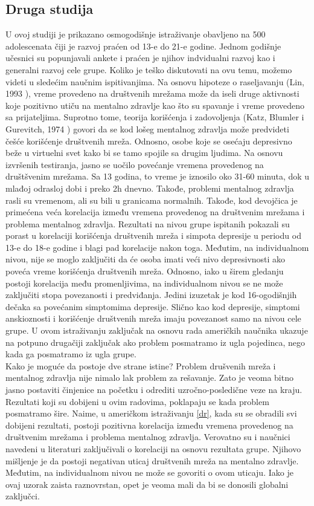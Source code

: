 \documentclass[a4paper]{article}
\begin{document}
{		\subsection{Druga studija}
		\label{dr}
		U ovoj studiji je prikazano osmogodišnje istraživanje obavljeno na 500 adolescenata čiji je razvoj praćen od 13-e do 21-e godine. Jednom godišnje učesnici su popunjavali ankete i praćen je njihov indvidualni razvoj kao i generalni razvoj cele grupe. Koliko je teško diskutovati na ovu temu, možemo videti u sledećim naučnim ispitivanjima. Na osnovu hipoteze o raseljavanju (Lin, 1993 \cite{lin}), vreme provedeno na društvenih mrežama može da iseli druge aktivnosti koje pozitivno utiču na mentalno zdravlje kao što su spavanje i vreme provedeno sa prijateljima. Suprotno tome, teorija korišćenja i zadovoljenja (Katz, Blumler i Gurevitch, 1974 \cite{katz}) govori da se kod lošeg mentalnog zdravlja može predvideti češće korišćenje društvenih mreža. Odnosno, osobe koje se osećaju depresivno beže u virtuelni svet kako bi se tamo spojile sa drugim ljudima. Na osnovu izvršenih testiranja, jasno se uočilo povećanje vremena provedenog na društšvenim mrežama. Sa 13 godina, to vreme je iznosilo oko 31-60 minuta, dok u mlađoj odrasloj dobi i preko 2h dnevno. Takođe, problemi mentalnog zdravlja rasli su vremenom, ali su bili u granicama normalnih. Takođe, kod devojčica je primećena veća korelacija između vremena provedenog na društvenim mrežama i problema mentalnog zdravlja. Rezultati na nivou grupe ispitanih pokazali su porast u korelaciji korišćenja društvenih mreža i simpota depresije u periodu od 13-e do 18-e godine i blagi pad korelacije nakon toga. Međutim, na individualnom nivou, nije se moglo zaključiti da će osoba imati veći nivo depresivnosti ako poveća vreme korišćenja društvenih mreža. Odnosno, iako u širem gledanju postoji korelacija među promenljivima, na individualnom nivou se ne može zaključiti stopa povezanosti i predviđanja. Jedini izuzetak je kod 16-ogodišnjih dečaka sa povećanim simptomima depresije. Slično kao kod depresije, simptomi anskioznosti i korišćenje društvenih mreža imaju
		povezanost samo na nivou cele grupe. U ovom istraživanju zaključak na osnovu rada američkih naučnika ukazuje na potpuno drugačiji zaključak ako problem posmatramo iz ugla pojedinca, nego kada ga posmatramo iz ugla grupe.\\
		Kako je moguće da postoje dve strane istine? Problem drušvenih mreža i mentalnog zdravlja nije nimalo lak problem za rešavanje. Zato je veoma bitno jasno postaviti činjenice na početku i odrediti uzročno-posledične veze na kraju. Rezultati koji su dobijeni u ovim radovima, poklapaju se kada problem posmatramo šire. Naime, u američkom istraživanju \eqref{dr}, kada su se obradili svi dobijeni rezultati, postoji pozitivna korelacija između vremena provedenog na društvenim mrežama i problema mentalnog zdravlja. Verovatno su i naučnici navedeni u literaturi zaključivali o korelaciji na osnovu rezultata grupe. Njihovo mišljenje je da postoji negativan uticaj društvenih mreža na mentalno zdravlje. Međutim, na individualnom nivou ne može se govoriti o ovom uticaju. Iako je ovaj uzorak zaista raznovrstan, opet je veoma mali da bi se donosili globalni zaključci. 
		
}
\end{document}
